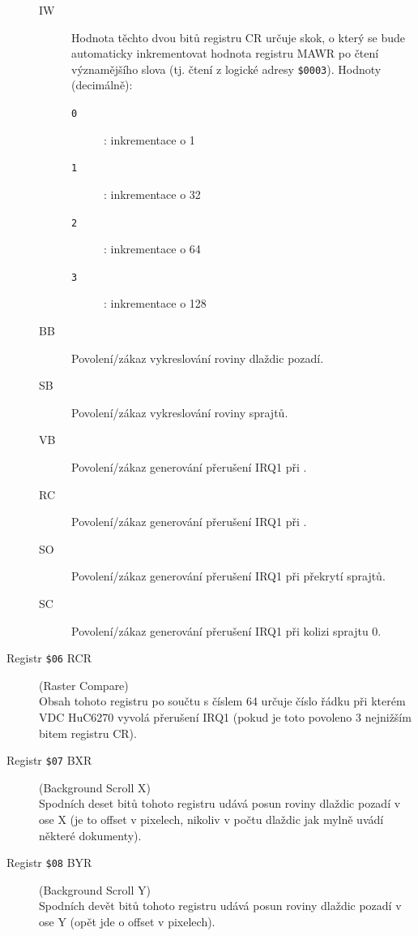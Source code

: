 \begin{description}
	\begin{description}
	\item[IW] Hodnota těchto dvou bitů registru {\sf CR} určuje skok, o který
		se bude automaticky inkrementovat hodnota registru {\sf MAWR} po čtení
		významějšího slova (tj. čtení z logické adresy {\tt \$0003}). Hodnoty
		(decimálně):
		\begin{description}
		\item[{\tt 0}]: inkrementace o 1
		\item[{\tt 1}]: inkrementace o 32
		\item[{\tt 2}]: inkrementace o 64
		\item[{\tt 3}]: inkrementace o 128
		\end{description}

	\item[BB] Povolení/zákaz vykreslování roviny dlaždic pozadí.

	\item[SB] Povolení/zákaz vykreslování roviny sprajtů.

	\item[VB] Povolení/zákaz generování přerušení IRQ1 při .

	\item[RC] Povolení/zákaz generování přerušení IRQ1 při .

	\item[SO] Povolení/zákaz generování přerušení IRQ1 při překrytí sprajtů.

	\item[SC] Povolení/zákaz generování přerušení IRQ1 při kolizi sprajtu 0.
	\end{description}

\item[Registr {\tt \$06} {\sf RCR}] (Raster Compare) \\
	Obsah tohoto registru po součtu s číslem 64 určuje číslo řádku při kterém
	VDC HuC6270 vyvolá přerušení IRQ1 (pokud je toto povoleno 3 nejnižším bitem
	registru {\sf CR}).

\item[Registr {\tt \$07} {\sf BXR}] (Background Scroll X) \\
	Spodních deset bitů tohoto registru udává posun roviny dlaždic pozadí v ose
	X (je to offset v pixelech, nikoliv v počtu dlaždic jak mylně uvádí některé
	dokumenty).

\item[Registr {\tt \$08} {\sf BYR}] (Background Scroll Y) \\
	Spodních devět bitů tohoto registru udává posun roviny dlaždic pozadí v ose
	Y (opět jde o offset v pixelech).


\end{description}

